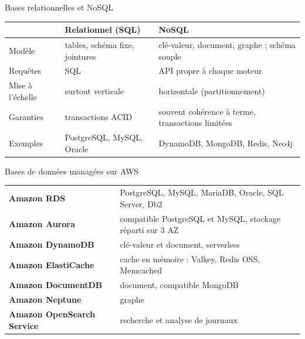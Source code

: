 \begin{frame}{Bases relationnelles et NoSQL}
  \renewcommand{\arraystretch}{1.35}
  \begin{tabularx}{\textwidth}{@{}>{\raggedright\arraybackslash}p{2.8cm}>{\raggedright\arraybackslash}X>{\raggedright\arraybackslash}X@{}}
    \toprule
    & \textbf{Relationnel (SQL)} & \textbf{NoSQL} \\ \midrule
    Modèle & tables, schéma fixe, jointures & clé-valeur, document, graphe ; schéma souple \\
    Requêtes & SQL & API propre à chaque moteur \\
    Mise à l'échelle & surtout verticale & horizontale (partitionnement) \\
    Garanties & transactions ACID & souvent cohérence à terme, transactions limitées \\
    Exemples & PostgreSQL, MySQL, Oracle & DynamoDB, MongoDB, Redis, Neo4j \\ \bottomrule
  \end{tabularx}
\end{frame}

\begin{frame}{Bases de données managées sur AWS}
  \renewcommand{\arraystretch}{1.35}
  \begin{tabularx}{\textwidth}{@{}>{\raggedright\arraybackslash}p{4cm}>{\raggedright\arraybackslash}X@{}}
    \toprule
    \textbf{Amazon RDS} & PostgreSQL, MySQL, MariaDB, Oracle, SQL Server, Db2 \\
    \textbf{Amazon Aurora} & compatible PostgreSQL et MySQL, stockage réparti sur 3 AZ \\
    \textbf{Amazon DynamoDB} & clé-valeur et document, serverless \\
    \textbf{Amazon ElastiCache} & cache en mémoire : Valkey, Redis OSS, Memcached \\
    \textbf{Amazon DocumentDB} & document, compatible MongoDB \\
    \textbf{Amazon Neptune} & graphe \\
    \textbf{Amazon OpenSearch Service} & recherche et analyse de journaux \\ \bottomrule
  \end{tabularx}
\end{frame}

